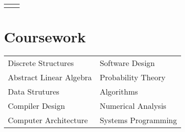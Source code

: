 \documentclass[10pt, oneside]{article} %
\begin{document}
\begin{paracol}{2}
\begin{supertabular}{rl}

		
\end{supertabular}


\section{Coursework}

\begin{tabular}{l l}
Discrete Structures & Software Design\\
Abstract Linear Algebra &  Probability Theory\\
Data Strutures & Algorithms\\
Compiler Design & Numerical Analysis\\
Computer Architecture & Systems Programming\\
\end{tabular}










\end{paracol}
\end{document}
